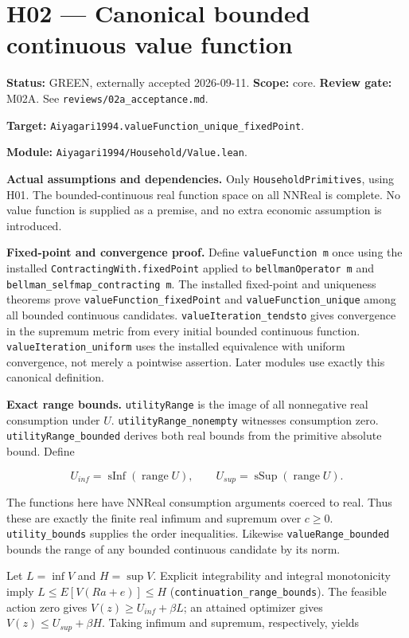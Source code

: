 \documentclass[
  11pt,
]{article}
\let\LedgerOriginalTexttt\texttt
\renewcommand{\texttt}[1]{{\small\LedgerOriginalTexttt{#1}}}
\begin{document}
\section{H02 --- Canonical bounded continuous value
function}\label{h02-canonical-bounded-continuous-value-function}

\textbf{Status:} GREEN, externally accepted 2026-09-11. \textbf{Scope:}
core. \textbf{Review gate:} M02A. See
\texttt{reviews/02a\_acceptance.md}.

\textbf{Target:}
\texttt{Aiyagari1994.valueFunction\_unique\_fixedPoint}.

\textbf{Module:} \texttt{Aiyagari1994/Household/Value.lean}.

\textbf{Actual assumptions and dependencies.} Only
\texttt{HouseholdPrimitives}, using H01. The bounded-continuous real
function space on all NNReal is complete. No value function is supplied
as a premise, and no extra economic assumption is introduced.

\textbf{Fixed-point and convergence proof.} Define
\texttt{valueFunction\ m} once using the installed
\texttt{ContractingWith.fixedPoint} applied to
\texttt{bellmanOperator\ m} and
\texttt{bellman\_selfmap\_contracting\ m}. The installed fixed-point and
uniqueness theorems prove \texttt{valueFunction\_fixedPoint} and
\texttt{valueFunction\_unique} among all bounded continuous candidates.
\texttt{valueIteration\_tendsto} gives convergence in the supremum
metric from every initial bounded continuous function.
\texttt{valueIteration\_uniform} uses the installed equivalence with
uniform convergence, not merely a pointwise assertion. Later modules use
exactly this canonical definition.

\textbf{Exact range bounds.} \texttt{utilityRange} is the image of all
nonnegative real consumption under \(U\).
\texttt{utilityRange\_nonempty} witnesses consumption zero.
\texttt{utilityRange\_bounded} derives both real bounds from the
primitive absolute bound. Define

\[U_{inf}=\operatorname{sInf}(\operatorname{range}U),\qquad
U_{sup}=\operatorname{sSup}(\operatorname{range}U).\]

The functions here have NNReal consumption arguments coerced to real.
Thus these are exactly the finite real infimum and supremum over
\(c\geq0\). \texttt{utility\_bounds} supplies the order inequalities.
Likewise \texttt{valueRange\_bounded} bounds the range of any bounded
continuous candidate by its norm.

Let \(L=\inf V\) and \(H=\sup V\). Explicit integrability and integral
monotonicity imply \(L\leq E[V(Ra+e)]\leq H\)
(\texttt{continuation\_range\_bounds}). The feasible action zero gives
\(V(z)\geq U_{inf}+\beta L\); an attained optimizer gives
\(V(z)\leq U_{sup}+\beta H\). Taking infimum and supremum, respectively,
yields
\end{document}
